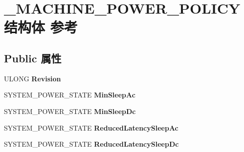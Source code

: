 \hypertarget{struct___m_a_c_h_i_n_e___p_o_w_e_r___p_o_l_i_c_y}{}\section{\+\_\+\+M\+A\+C\+H\+I\+N\+E\+\_\+\+P\+O\+W\+E\+R\+\_\+\+P\+O\+L\+I\+C\+Y结构体 参考}
\label{struct___m_a_c_h_i_n_e___p_o_w_e_r___p_o_l_i_c_y}
\subsection*{Public 属性}
\begin{DoxyCompactItemize}
\item 
\mbox{\label{struct___m_a_c_h_i_n_e___p_o_w_e_r___p_o_l_i_c_y_aef4ef7cd09541cb6fab711ea197c320b}} 
U\+L\+O\+NG {\bfseries Revision}
\item 
\mbox{\label{struct___m_a_c_h_i_n_e___p_o_w_e_r___p_o_l_i_c_y_a1769e293e97f530ab519c2070be11d03}} 
S\+Y\+S\+T\+E\+M\+\_\+\+P\+O\+W\+E\+R\+\_\+\+S\+T\+A\+TE {\bfseries Min\+Sleep\+Ac}
\item 
\mbox{\label{struct___m_a_c_h_i_n_e___p_o_w_e_r___p_o_l_i_c_y_ae02e3ec5b7775dacf624ba439715ab94}} 
S\+Y\+S\+T\+E\+M\+\_\+\+P\+O\+W\+E\+R\+\_\+\+S\+T\+A\+TE {\bfseries Min\+Sleep\+Dc}
\item 
\mbox{\label{struct___m_a_c_h_i_n_e___p_o_w_e_r___p_o_l_i_c_y_a9347a31fd9184514f4695915e3165dae}} 
S\+Y\+S\+T\+E\+M\+\_\+\+P\+O\+W\+E\+R\+\_\+\+S\+T\+A\+TE {\bfseries Reduced\+Latency\+Sleep\+Ac}
\item 
\mbox{\label{struct___m_a_c_h_i_n_e___p_o_w_e_r___p_o_l_i_c_y_a41a5e14d2856c4f79c3f7da41ba64adc}} 
S\+Y\+S\+T\+E\+M\+\_\+\+P\+O\+W\+E\+R\+\_\+\+S\+T\+A\+TE {\bfseries Reduced\+Latency\+Sleep\+Dc}
\item 
\mbox{\label{struct___m_a_c_h_i_n_e___p_o_w_e_r___p_o_l_i_c_y_a28fbc7a3cc5ae27f3e76e5af013e041b}} 

\end{DoxyCompactItemize}
